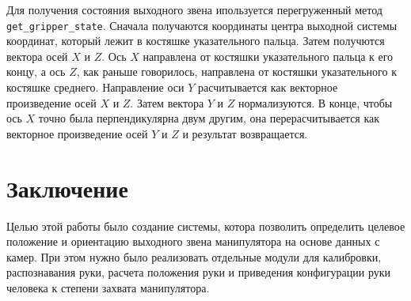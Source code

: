 \documentclass[12pt, a4paper]{article}
\begin{document}
Для получения состояния выходного звена ипользуется перегруженный метод
\texttt{get\_gripper\_state}. Сначала получаются координаты центра выходной
системы координат, который лежит в костяшке указательного пальца.
Затем получются вектора осей $X$ и $Z$. Ось $X$ направлена от костяшки
указательного пальца к его концу, а ось $Z$, как раньше говорилось,
направлена от костяшки указательного к костяшке среднего.
Направление оси $Y$ расчитывается как векторное произведение осей $X$ и $Z$.
Затем вектора $Y$ и $Z$ нормализуются.
В конце, чтобы ось $X$ точно была перпендикулярна двум другим, она
перерасчитывается как векторное произведение осей $Y$ и $Z$ и результат
возвращается.

 
\section{Заключение}
Целью этой работы было создание системы, котора позволить определить целевое
положение и ориентацию выходного звена манипулятора на основе данных с камер.
При этом нужно было реализовать отдельные модули для калибровки, распознавания
руки, расчета положения руки и приведения конфигурации руки человека к степени
захвата манипулятора.
  
\end{document}
